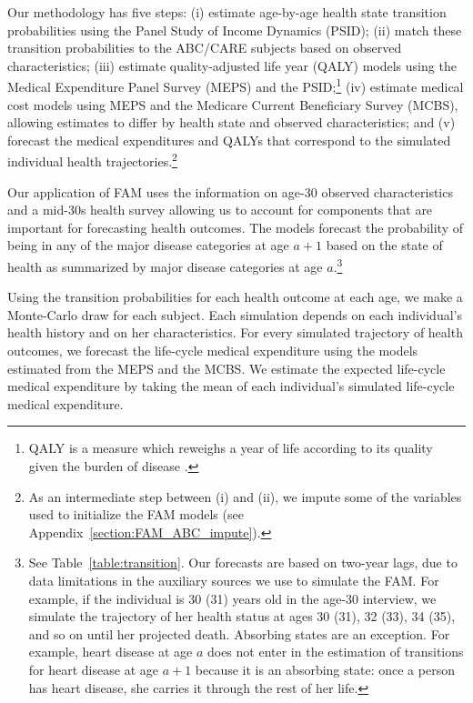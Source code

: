 Our methodology has five steps: (i) estimate age-by-age health state transition probabilities using the Panel Study of Income Dynamics (PSID); (ii) match these transition probabilities to the ABC/CARE subjects based on observed characteristics; (iii) estimate quality-adjusted life year (QALY) models using the Medical Expenditure Panel Survey (MEPS) and the PSID;\footnote{QALY is a measure which reweighs a year of life according to its quality given the burden of disease \citep{Dolan_1997_Modeling_MC,Shaw_etal_2005_EQ5D_MC}.} (iv) estimate medical cost models using MEPS and the Medicare Current Beneficiary Survey (MCBS), allowing estimates to differ by health state and observed characteristics; and (v) forecast the medical expenditures and QALYs that correspond to the simulated individual health trajectories.\footnote{As an intermediate step between (i) and (ii), we impute some of the variables used to initialize the FAM models (see  Appendix~\ref{section:FAM_ABC_impute}).}

Our application of FAM uses the information on age-30 observed characteristics and a mid-30s health survey allowing us to account for components that are important for forecasting health outcomes. The models forecast the probability of being in any of the major disease categories at age $a+1$ based on the state of health as summarized by major disease categories at age $a$.\footnote{See Table~\ref{table:transition}. Our forecasts are based on two-year lags, due to data limitations in the auxiliary sources we use to simulate the FAM. For example, if the individual is 30 (31) years old in the age-30 interview, we simulate the trajectory of her health status at ages 30 (31), 32 (33), 34 (35), and so on until her projected death. Absorbing states are an exception. For example, heart disease at age $a$ does not enter in the estimation of transitions for heart disease at age $a+1$ because it is an absorbing state: once a person has heart disease, she carries it through the rest of her life.}

Using the transition probabilities for each health outcome at each age, we make a Monte-Carlo draw for each subject. Each simulation depends on each individual's health history and on her characteristics. For every simulated trajectory of health outcomes, we forecast the life-cycle medical expenditure using the models estimated from the MEPS and the MCBS. We estimate the expected life-cycle medical expenditure by taking the mean of each individual's simulated life-cycle medical expenditure.

